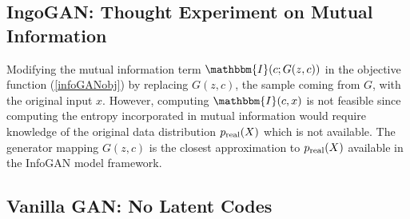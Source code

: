 \documentclass{article}
\newcommand{\I}{\mathbbm{I}}
\begin{document}


\subsection{IngoGAN: Thought Experiment on Mutual Information}

Modifying the mutual information term $\I(c; G(z,c))$ in the objective function (\ref{infoGANobj}) by replacing $G(z,c)$, the sample coming from $G$, with the original input $x$. However,  computing $\I(c,x)$ is not feasible since computing the entropy incorporated in mutual information would require knowledge of the original data distribution $p_{\rm{real}}(X)$ which is not available. The generator mapping $G(z,c)$ is the closest approximation to $p_{\rm{real}}(X)$ available in the InfoGAN model framework.

\subsection{Vanilla GAN: No Latent Codes}
\end{document}
